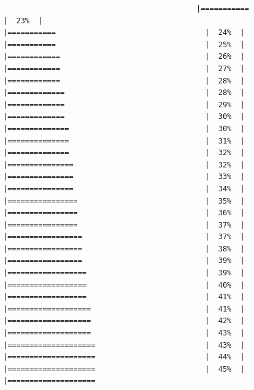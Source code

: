 \documentclass[
  krantz2]{krantz}
\begin{document}
\begin{verbatim}
                                            |===========                                  |  23%  |                                                     |===========                                  |  24%  |                                                     |===========                                  |  25%  |                                                     |============                                 |  26%  |                                                     |============                                 |  27%  |                                                     |============                                 |  28%  |                                                     |=============                                |  28%  |                                                     |=============                                |  29%  |                                                     |=============                                |  30%  |                                                     |==============                               |  30%  |                                                     |==============                               |  31%  |                                                     |==============                               |  32%  |                                                     |===============                              |  32%  |                                                     |===============                              |  33%  |                                                     |===============                              |  34%  |                                                     |================                             |  35%  |                                                     |================                             |  36%  |                                                     |================                             |  37%  |                                                     |=================                            |  37%  |                                                     |=================                            |  38%  |                                                     |=================                            |  39%  |                                                     |==================                           |  39%  |                                                     |==================                           |  40%  |                                                     |==================                           |  41%  |                                                     |===================                          |  41%  |                                                     |===================                          |  42%  |                                                     |===================                          |  43%  |                                                     |====================                         |  43%  |                                                     |====================                         |  44%  |                                                     |====================                         |  45%  |                                                     |====================              
\end{verbatim}
\end{document}
